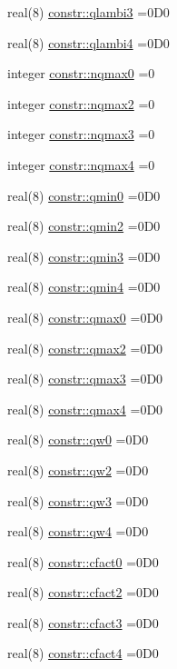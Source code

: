 \begin{DoxyCompactItemize}
\item 
real(8) \hyperlink{namespaceconstr_a4a0d15f8f8e83f0b7dd528b860449684}{constr\+::qlambi3} =0\+D0
\item 
real(8) \hyperlink{namespaceconstr_a64a62a693071f3fa8bd0f3c3f59bf7df}{constr\+::qlambi4} =0\+D0
\item 
integer \hyperlink{namespaceconstr_a710fd344f93aa434d6f4482c305d49fe}{constr\+::nqmax0} =0
\item 
integer \hyperlink{namespaceconstr_a15579247e103dc4f248a298032da8b95}{constr\+::nqmax2} =0
\item 
integer \hyperlink{namespaceconstr_a374984e30040eafafc33bee0ed78bdd0}{constr\+::nqmax3} =0
\item 
integer \hyperlink{namespaceconstr_a36db4844bd18081dedf01da07f16b382}{constr\+::nqmax4} =0
\item 
real(8) \hyperlink{namespaceconstr_ac52c340509e8bedd691c20cc9be67934}{constr\+::qmin0} =0\+D0
\item 
real(8) \hyperlink{namespaceconstr_a7683d16fd08be543d6dda9c32e6a3eea}{constr\+::qmin2} =0\+D0
\item 
real(8) \hyperlink{namespaceconstr_aea591e60298cd3b40646923a1d91885f}{constr\+::qmin3} =0\+D0
\item 
real(8) \hyperlink{namespaceconstr_a0e331fe923c308ed2f8d34f3124d7c6e}{constr\+::qmin4} =0\+D0
\item 
real(8) \hyperlink{namespaceconstr_aadabc5bc09c3392f9c3270c23730c058}{constr\+::qmax0} =0\+D0
\item 
real(8) \hyperlink{namespaceconstr_a066ca2e91e314548af79d5d21de0f379}{constr\+::qmax2} =0\+D0
\item 
real(8) \hyperlink{namespaceconstr_a05af2891f745e5c96eab416183d9fc47}{constr\+::qmax3} =0\+D0
\item 
real(8) \hyperlink{namespaceconstr_aa0342fbb3aba37cf00c90a73295852b5}{constr\+::qmax4} =0\+D0
\item 
real(8) \hyperlink{namespaceconstr_a161ed801cc9ba0cce6a99c1f538b1f11}{constr\+::qw0} =0\+D0
\item 
real(8) \hyperlink{namespaceconstr_ab35bdc97e1451a6829b2a06c5ffb60a1}{constr\+::qw2} =0\+D0
\item 
real(8) \hyperlink{namespaceconstr_a7e725c2dd7ba2a518ad31afe2a64da7d}{constr\+::qw3} =0\+D0
\item 
real(8) \hyperlink{namespaceconstr_adcfe684411ef071acb9b6f175ab03de9}{constr\+::qw4} =0\+D0
\item 
real(8) \hyperlink{namespaceconstr_a17bf2198be05743793e7087222c361fc}{constr\+::cfact0} =0\+D0
\item 
real(8) \hyperlink{namespaceconstr_a591b901ac5754962e45ddc92731c2146}{constr\+::cfact2} =0\+D0
\item 
real(8) \hyperlink{namespaceconstr_a15601a01ae3ca3eb08a1601dd4e438ce}{constr\+::cfact3} =0\+D0
\item 
real(8) \hyperlink{namespaceconstr_ab4830c64d138d923cb6d11dfb07645f1}{constr\+::cfact4} =0\+D0
\end{DoxyCompactItemize}
